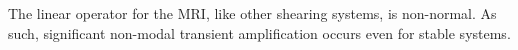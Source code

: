 \documentclass[aps,prl,reprint,superscriptaddress]{revtex4-1}
\begin{document}
The linear operator for the MRI, like other shearing systems, is non-normal.
As such, significant non-modal transient amplification occurs even for stable systems.




%


\end{document}
